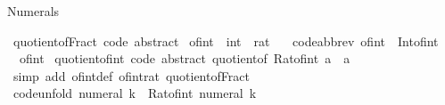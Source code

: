\begin{isabellebody}
\endisatagproof
{\isafoldproof}%
%
\isadelimproof
%
\endisadelimproof
%
\begin{isamarkuptext}%
Numerals%
\end{isamarkuptext}\isamarkuptrue%
\isamarkupfalse%
\ quotient{\isacharunderscore}{\kern0pt}of{\isacharunderscore}{\kern0pt}Fract\ {\isacharbrackleft}{\kern0pt}code\ abstract{\isacharbrackright}{\kern0pt}\isanewline
\isanewline
{}\isamarkupfalse%
\ of{\isacharunderscore}{\kern0pt}int\ {\isacharcolon}{\kern0pt}{\isacharcolon}{\kern0pt}\ {\isachardoublequoteopen}int\ {\isasymRightarrow}\ rat{\isachardoublequoteclose}\isanewline
\ \ \ {\isacharbrackleft}{\kern0pt}code{\isacharunderscore}{\kern0pt}abbrev{\isacharbrackright}{\kern0pt}{\isacharcolon}{\kern0pt}\ {\isachardoublequoteopen}of{\isacharunderscore}{\kern0pt}int\ {\isacharequal}{\kern0pt}\ Int{\isachardot}{\kern0pt}of{\isacharunderscore}{\kern0pt}int{\isachardoublequoteclose}\isanewline
\isanewline
{}\isamarkupfalse%
\ {\isacharparenleft}{\kern0pt}\ of{\isacharunderscore}{\kern0pt}int\isanewline
\isanewline
{}\isamarkupfalse%
\ quotient{\isacharunderscore}{\kern0pt}of{\isacharunderscore}{\kern0pt}int\ {\isacharbrackleft}{\kern0pt}code\ abstract{\isacharbrackright}{\kern0pt}{\isacharcolon}{\kern0pt}\ {\isachardoublequoteopen}quotient{\isacharunderscore}{\kern0pt}of\ {\isacharparenleft}{\kern0pt}Rat{\isachardot}{\kern0pt}of{\isacharunderscore}{\kern0pt}int\ a{\isacharparenright}{\kern0pt}\ {\isacharequal}{\kern0pt}\ {\isacharparenleft}{\kern0pt}a{\isacharcomma}{\kern0pt}\ {}{\isacharparenright}{\kern0pt}{\isachardoublequoteclose}\isanewline
%
\isadelimproof
\ \ %
\endisadelimproof
%
\isatagproof
{}\isamarkupfalse%
\ {\isacharparenleft}{\kern0pt}simp\ add{\isacharcolon}{\kern0pt}\ of{\isacharunderscore}{\kern0pt}int{\isacharunderscore}{\kern0pt}def\ of{\isacharunderscore}{\kern0pt}int{\isacharunderscore}{\kern0pt}rat\ quotient{\isacharunderscore}{\kern0pt}of{\isacharunderscore}{\kern0pt}Fract{\isacharparenright}{\kern0pt}%
\endisatagproof
{\isafoldproof}%
%
\isadelimproof
\isanewline
%
\endisadelimproof
\isanewline
{}\isamarkupfalse%
\ {\isacharbrackleft}{\kern0pt}code{\isacharunderscore}{\kern0pt}unfold{\isacharbrackright}{\kern0pt}{\isacharcolon}{\kern0pt}\ {\isachardoublequoteopen}numeral\ k\ {\isacharequal}{\kern0pt}\ Rat{\isachardot}{\kern0pt}of{\isacharunderscore}{\kern0pt}int\ {\isacharparenleft}{\kern0pt}numeral\ k{\isacharparenright}{\kern0pt}{\isachardoublequoteclose}\isanewline

\end{isabellebody}
